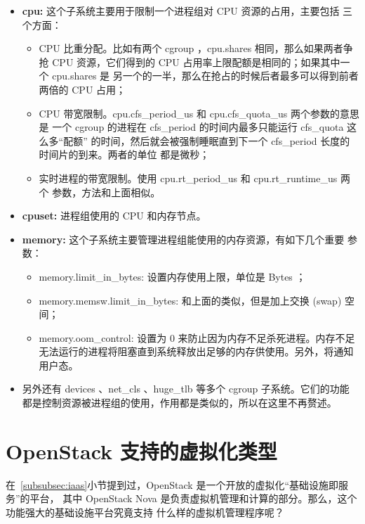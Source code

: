 \begin{itemize}
    \item \textbf{cpu:} 这个子系统主要用于限制一个进程组对 CPU 资源的占用，主要包括
    三个方面：
    \begin{itemize}
        \item CPU 比重分配。比如有两个 cgroup ，cpu.shares 相同，那么如果两者争抢
        CPU 资源，它们得到的 CPU 占用率上限配额是相同的；如果其中一个 cpu.shares 是
        另一个的一半，那么在抢占的时候后者最多可以得到前者两倍的 CPU 占用；
        \item CPU 带宽限制。cpu.cfs\_period\_us 和 cpu.cfs\_quota\_us 两个参数的意思是
        一个 cgroup 的进程在 cfs\_period 的时间内最多只能运行 cfs\_quota 这么多“配额”
        的时间，然后就会被强制睡眠直到下一个 cfs\_period 长度的时间片的到来。两者的单位
        都是微秒；
        \item 实时进程的带宽限制。使用 cpu.rt\_period\_us 和 cpu.rt\_runtime\_us 两个
        参数，方法和上面相似。
    \end{itemize}
    \item \textbf{cpuset:} 进程组使用的 CPU 和内存节点。
    \item \textbf{memory:} 这个子系统主要管理进程组能使用的内存资源，有如下几个重要
    参数：
    \begin{itemize}
        \item memory.limit\_in\_bytes: 设置内存使用上限，单位是 Bytes ；
        \item memory.memsw.limit\_in\_bytes: 和上面的类似，但是加上交换 (swap) 空间；
        \item memory.oom\_control: 设置为 0 来防止因为内存不足杀死进程。内存不足
        无法运行的进程将阻塞直到系统释放出足够的内存供使用。另外，将通知用户态。
    \end{itemize}
    \item 另外还有 devices 、net\_cls 、huge\_tlb 等多个 cgroup 子系统。它们的功能
    都是控制资源被进程组的使用，作用都是类似的，所以在这里不再赘述。
\end{itemize}

\section{OpenStack 支持的虚拟化类型}

在~\ref{subsubsec:iaas}小节提到过，OpenStack 是一个开放的虚拟化“基础设施即服务”的平台，
其中 OpenStack Nova 是负责虚拟机管理和计算的部分。那么，这个功能强大的基础设施平台究竟支持
什么样的虚拟机管理程序呢？

